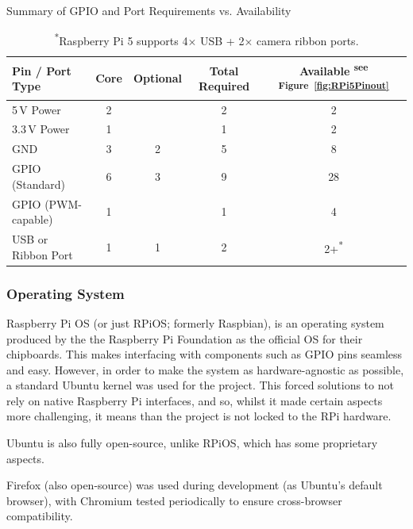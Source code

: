                 \begin{table}[htbp]
                    \centering
                    \caption{Summary of GPIO and Port Requirements vs. Availability}
                    \label{tab:pinSummary}
                    \begin{tabular}{|l|c|c|c|c|}
                        \hline
                        \textbf{Pin / Port Type} & \textbf{Core}& \textbf{Optional}& \textbf{Total Required} & \textbf{Available} \textsuperscript{see Figure~\ref{fig:RPi5Pinout}
    }}\\ \hline
                        5\,V Power & 2 & & 2 & 2 \\ \hline
                        3.3\,V Power & 1 & & 1& 2 \\ \hline
                        GND & 3 & 2 & 5 & 8 \\ \hline
                        GPIO (Standard) & 6 & 3 & 9 & 28 \\ \hline
                        GPIO (PWM-capable) & 1 & & 1 & 4 \\ \hline
                        USB or Ribbon Port & 1 & 1 & 2 & 2+\textsuperscript{*}\\ \hline
                    \end{tabular}
                    \caption*{\textsuperscript{*}Raspberry Pi 5 supports 4× USB + 2× camera ribbon ports.}
                \end{table}
    
            \subsubsection{Operating System}
    
                Raspberry Pi OS (or just RPiOS; formerly Raspbian), is an operating system produced by the the Raspberry Pi Foundation as the official OS for their chipboards. This makes interfacing with components such as GPIO pins seamless and easy. However, in order to make the system as hardware-agnostic as possible, a standard Ubuntu kernel was used for the project. This forced solutions to not rely on native Raspberry Pi interfaces, and so, whilst it made certain aspects more challenging, it means than the project is not locked to the RPi hardware.
    
                Ubuntu is also fully open-source, unlike RPiOS, which has some proprietary aspects.
    
                Firefox (also open-source) was used during development (as Ubuntu's default browser), with Chromium tested periodically to ensure cross-browser compatibility.
                
